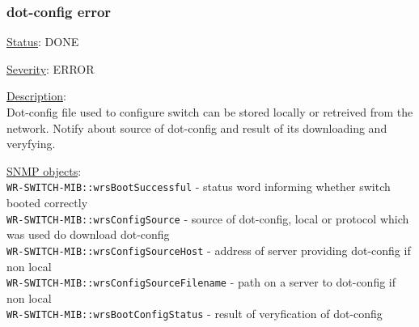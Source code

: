 \subsubsection{\bf dot-config error}
		\label{fail:other:dot-config}
		\begin{packed_enum}
			\item [] \underline{Status}: DONE
			\item [] \underline{Severity}: ERROR
			\item [] \underline{Description}:\\
				Dot-config file used to configure switch can be stored locally or retreived from the network.
				Notify about source of dot-config and result of its downloading and veryfying.
			\item [] \underline{SNMP objects}:\\
				\texttt{WR-SWITCH-MIB::wrsBootSuccessful} - status word informing whether switch booted correctly\\
				\texttt{WR-SWITCH-MIB::wrsConfigSource} - source of dot-config, local or protocol which was used do download dot-config\\
				\texttt{WR-SWITCH-MIB::wrsConfigSourceHost} - address of server providing dot-config if non local\\
				\texttt{WR-SWITCH-MIB::wrsConfigSourceFilename} - path on a server to dot-config if non local\\
				\texttt{WR-SWITCH-MIB::wrsBootConfigStatus} - result of veryfication of dot-config
		\end{packed_enum}

